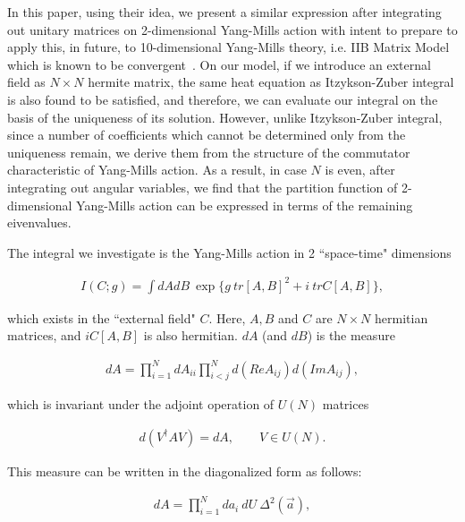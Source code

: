 \documentclass[a4paper,12pt]{article}
\begin{document}
In this paper, using their idea, we present a similar expression after integrating out unitary matrices on 2-dimensional Yang-Mills action with intent to prepare to apply this, in future, to 10-dimensional Yang-Mills theory, i.e. IIB Matrix Model~\cite{ikkt,ikkt2} which is known to be convergent~\cite{ymi}. On our model, if we introduce an external field as $N\! \times \! N$ hermite matrix, the same heat equation as Itzykson-Zuber integral is also found to be satisfied, and therefore, we can evaluate our integral on the basis of the uniqueness of its solution. However, unlike Itzykson-Zuber integral, since a number of coefficients which cannot be determined only from the uniqueness remain, we derive them from the structure of the commutator characteristic of Yang-Mills action. As a result, in case $N$ is even, after integrating out angular variables, we find that the partition function of 2-dimensional Yang-Mills action can be expressed in terms of the remaining eivenvalues.

\vskip 1.5cm


\vskip 0.5cm

The integral we investigate is the Yang-Mills action in 2 ``space-time" dimensions 

\begin{eqnarray}
	I(C;g)=\int dAdB \> \exp \Big\{ g\> tr[A,B]^2+i\> trC[A,B] \Big\} ,
\end{eqnarray}

\noindent which exists in the ``external field" $C$. Here, $A,B$ and $C$ are $N\! \times \! N$ hermitian matrices, and $iC[A,B]$ is also hermitian. $dA$ (and $dB$) is the measure 

\begin{eqnarray}
	dA=\prod_{i=1}^N dA_{ii} \prod_{i<j}^N d(ReA_{ij})d(ImA_{ij}),
\end{eqnarray}

\noindent which is invariant under the adjoint operation of $U(N)$ matrices 

\begin{eqnarray*}
	d(V^{\dagger}AV)=dA, \qquad V\in U(N).
\end{eqnarray*}

\noindent This measure can be written in the diagonalized form as follows: 

\begin{eqnarray}
	dA=\prod_{i=1}^N da_i \> dU \> \Delta^2 (\vec{a}),
\end{eqnarray}
\end{document}

